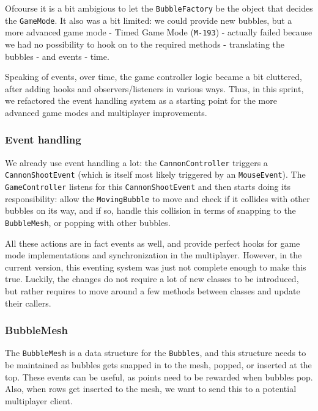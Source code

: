 \documentclass[a4paper]{article}
\begin{document}
\par{}Ofcourse it is a bit ambigious to let the \texttt{BubbleFactory} be the object that decides the \texttt{GameMode}. It also was a bit limited: we could provide new bubbles, but a more advanced game mode - Timed Game Mode (\texttt{M-193}) - actually failed because we had no possibility to hook on to the required methods - translating the bubbles - and events - time.

\par{}Speaking of events, over time, the game controller logic became a bit cluttered, after adding hooks and observers/listeners in various ways. Thus, in this sprint, we refactored the event handling system as a starting point for the more advanced game modes and multiplayer improvements.

\subsubsection{Event handling}
\label{sec:evthdl}

We already use event handling a lot: the \texttt{CannonController} triggers a \texttt{CannonShootEvent} (which is itself most likely triggered by an \texttt{MouseEvent}). The \texttt{GameController} listens for this \texttt{CannonShootEvent} and then starts doing its responsibility: allow the \texttt{MovingBubble} to move and check if it collides with other bubbles on its way, and if so, handle this collision in terms of snapping to the \texttt{BubbleMesh}, or popping with other bubbles.

\par All these actions are in fact events as well, and provide perfect hooks for game mode implementations and  synchronization in the multiplayer. However, in the current version, this eventing system was just not complete enough to make this true. Luckily, the changes do not require a lot of new classes to be introduced, but rather requires to move around a few methods between classes and update their callers.

\subsubsection*{BubbleMesh}
The \texttt{BubbleMesh} is a data structure for the \texttt{Bubbles}, and this structure needs to be maintained as bubbles gets snapped in to the mesh, popped, or inserted at the top. These events can be useful, as points need to be rewarded when bubbles pop. Also, when rows get inserted to the mesh, we want to send this to a potential multiplayer client.
\end{document}
